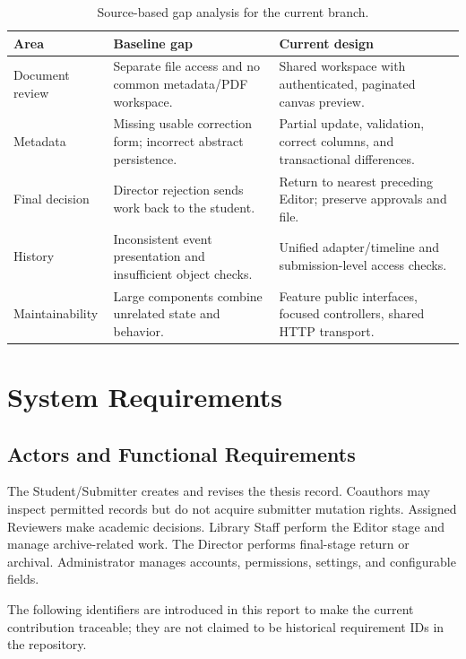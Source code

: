 \documentclass[11pt,a4paper]{report}
\begin{document}
\begin{table}[htbp]
\centering\small
\begin{tabularx}{\textwidth}{@{}p{} Y Y@{}}
\toprule
\textbf{Area} & \textbf{Baseline gap} & \textbf{Current design} \\
\midrule
Document review & Separate file access and no common metadata/PDF workspace. & Shared workspace with authenticated, paginated canvas preview. \\
Metadata & Missing usable correction form; incorrect abstract persistence. & Partial update, validation, correct columns, and transactional differences. \\
Final decision & Director rejection sends work back to the student. & Return to nearest preceding Editor; preserve approvals and file. \\
History & Inconsistent event presentation and insufficient object checks. & Unified adapter/timeline and submission-level access checks. \\
Maintainability & Large components combine unrelated state and behavior. & Feature public interfaces, focused controllers, shared HTTP transport. \\
\bottomrule
\end{tabularx}
\caption{Source-based gap analysis for the current branch.}
\label{tab:gaps}
\end{table}

\section{System Requirements}
\subsection{Actors and Functional Requirements}
The Student/Submitter creates and revises the thesis record. Coauthors may inspect permitted records but do not acquire submitter mutation rights. Assigned Reviewers make academic decisions. Library Staff perform the Editor stage and manage archive-related work. The Director performs final-stage return or archival. Administrator manages accounts, permissions, settings, and configurable fields.

The following identifiers are introduced in this report to make the current contribution traceable; they are not claimed to be historical requirement IDs in the repository.
\end{document}
